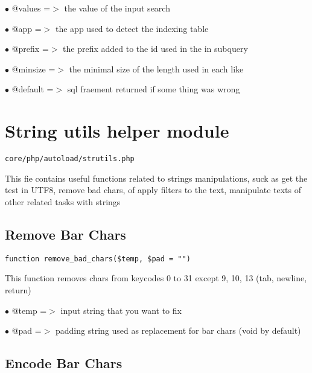 \documentclass[a4paper]{book}
\begin{document}
\begin{compactitem}
\item[\color{myblue}$\bullet$] @values  =$>$ the value of the input search
\item[\color{myblue}$\bullet$] @app     =$>$ the app used to detect the indexing table
\item[\color{myblue}$\bullet$] @prefix  =$>$ the prefix added to the id used in the in subquery
\item[\color{myblue}$\bullet$] @minsize =$>$ the minimal size of the length used in each like
\item[\color{myblue}$\bullet$] @default =$>$ sql fraement returned if some thing was wrong
\end{compactitem}

\hypertarget{toc250}{}
\section{String utils helper module}

\begin{lstlisting}
core/php/autoload/strutils.php
\end{lstlisting}

This fie contains useful functions related to strings manipulations, suck as get the test in
UTF8, remove bad chars, of apply filters to the text, manipulate texts of other related tasks
with strings

\hypertarget{toc251}{}
\subsection{Remove Bar Chars}

\begin{lstlisting}
function remove_bad_chars($temp, $pad = "")
\end{lstlisting}

This function removes chars from keycodes 0 to 31 except 9, 10, 13 (tab,
newline, return)

\begin{compactitem}
\item[\color{myblue}$\bullet$] @temp =$>$ input string that you want to fix
\item[\color{myblue}$\bullet$] @pad  =$>$ padding string used as replacement for bar chars (void by default)
\end{compactitem}

\hypertarget{toc252}{}
\subsection{Encode Bar Chars}
\end{document}
